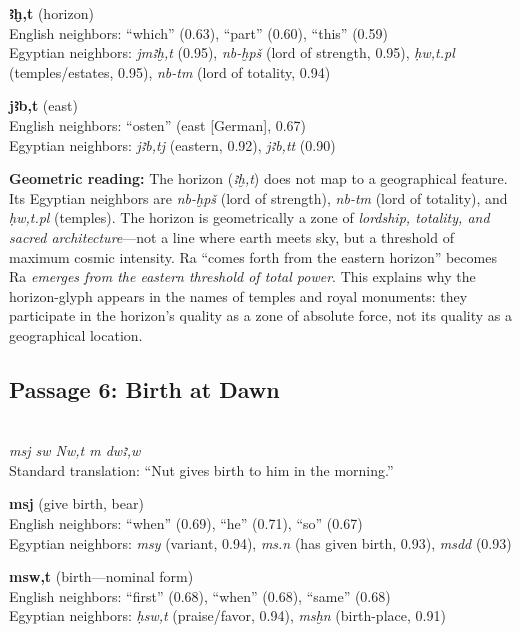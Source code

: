 \documentclass[11pt, a4paper]{article}
\newcommand{\passagehiero}[1]{{\normalfont\hierofont\fontsize{14}{17}\selectfont #1}}
\begin{document}
\medskip

\noindent\textbf{ꜣḫ,t} (horizon)\\
English neighbors: ``which'' (0.63), ``part'' (0.60), ``this'' (0.59)\\
Egyptian neighbors: \textit{jmꜣḫ,t} (0.95), \textit{nb-ḫpš} (lord of strength, 0.95), \textit{ḥw,t.pl} (temples/estates, 0.95), \textit{nb-tm} (lord of totality, 0.94)

\medskip

\noindent\textbf{jꜣb,t} (east)\\
English neighbors: ``osten'' (east [German], 0.67)\\
Egyptian neighbors: \textit{jꜣb,tj} (eastern, 0.92), \textit{jꜣb,tt} (0.90)

\medskip

{\color{insight}\textbf{Geometric reading:}} The horizon (\textit{ꜣḫ,t}) does not map to a geographical feature. Its Egyptian neighbors are \textit{nb-ḫpš} (lord of strength), \textit{nb-tm} (lord of totality), and \textit{ḥw,t.pl} (temples). The horizon is geometrically a zone of \textit{lordship, totality, and sacred architecture}---not a line where earth meets sky, but a threshold of maximum cosmic intensity. Ra ``comes forth from the eastern horizon'' becomes Ra \textit{emerges from the eastern threshold of total power}. This explains why the horizon-glyph appears in the names of temples and royal monuments: they participate in the horizon's quality as a zone of absolute force, not its quality as a geographical location.

\subsection{Passage 6: Birth at Dawn}

{\color{passage}\passagehiero{𓅓𓊃𓇋 𓋴𓅱 𓈖𓅱𓏏𓇼 𓅓 𓂧𓅱𓄿𓅱}\\\medskip
\textit{\small msj sw Nw,t m dwꜣ,w}\\
Standard translation: ``Nut gives birth to him in the morning.''}

\bigskip

\noindent\textbf{msj} (give birth, bear)\\
English neighbors: ``when'' (0.69), ``he'' (0.71), ``so'' (0.67)\\
Egyptian neighbors: \textit{msy} (variant, 0.94), \textit{ms.n} (has given birth, 0.93), \textit{msdd} (0.93)

\medskip

\noindent\textbf{msw,t} (birth---nominal form)\\
English neighbors: ``first'' (0.68), ``when'' (0.68), ``same'' (0.68)\\
Egyptian neighbors: \textit{ḥsw,t} (praise/favor, 0.94), \textit{msḫn} (birth-place, 0.91)
\end{document}
